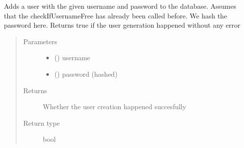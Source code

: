 \documentclass[letterpaper,10pt,english]{sphinxmanual}
\begin{document}
\begin{fulllineitems}
\label{\detokenize{db:db.createUser}}
Adds a user with the given username and password to the database. Assumes that the checkIfUsernameFree has already been called before. We hash the password here. Returns true if the user generation happened without any error
\begin{quote}\begin{description}
\item[{Parameters}] \leavevmode\begin{itemize}
\item {} 
 () \textendash{} username

\item {} 
 () \textendash{} password (hashed)

\end{itemize}

\item[{Returns}] \leavevmode
Whether the user creation happened succesfully

\item[{Return type}] \leavevmode
bool

\end{description}\end{quote}

\end{fulllineitems}

\end{document}
